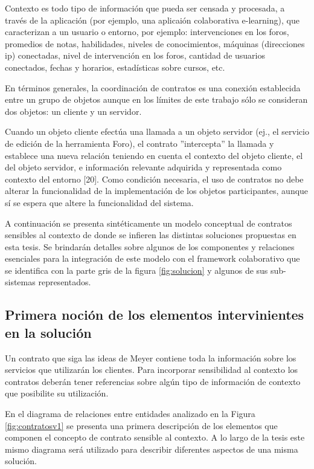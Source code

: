 Contexto es todo tipo de información que pueda ser censada y procesada, a través
de la aplicación (por ejemplo, una aplicaión colaborativa e-learning), que
caracterizan a un usuario o entorno, por
ejemplo: intervenciones en los foros, promedios de notas, habilidades, niveles
de conocimientos, máquinas (direcciones ip) conectadas, nivel de intervención en
los foros, cantidad de usuarios conectados, fechas y horarios, estadísticas
sobre cursos, etc.

En términos generales, la coordinación de contratos es una conexión
establecida entre un grupo de objetos aunque en los límites de este trabajo
sólo se consideran dos objetos: un cliente y un servidor.

Cuando un objeto cliente efectúa una llamada a un objeto servidor (ej., el
servicio de edición de la herramienta Foro), el contrato ”intercepta” la
llamada y establece una nueva relación teniendo en cuenta el contexto del
objeto cliente, el del objeto servidor, e información relevante adquirida
y representada como contexto del entorno [20]. Como condición necesaria, el uso
de contratos no debe alterar la funcionalidad de la implementación de los
objetos participantes, aunque sí se espera que altere la funcionalidad del
sistema.

A continuación se presenta sintéticamente un modelo conceptual de contratos sensibles
al contexto de donde se infieren las distintas soluciones propuestas en esta
tesis. Se brindarán detalles sobre algunos de los componentes y relaciones
esenciales para la integración de este modelo con el framework colaborativo que
se identifica con la parte gris de la figura \ref{fig:solucion} y algunos de
sus sub-sistemas representados.


\subsection{Primera noción de los elementos intervinientes en la solución}
\label{sec:elementoscontrato}

Un contrato que siga las ideas de Meyer contiene toda la información
sobre los servicios que utilizarán los clientes. Para incorporar sensibilidad
al contexto los contratos deberán tener referencias sobre algún tipo de
información de contexto que posibilite su utilización.

En el diagrama de relaciones entre entidades analizado en la Figura
\ref{fig:contratosv1} se presenta una primera descripción de los elementos
que componen el concepto de contrato sensible al contexto. A lo largo de la
tesis este mismo diagrama será utilizado para describir diferentes aspectos de
una misma solución. 


